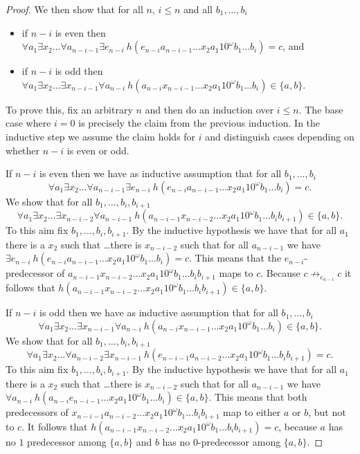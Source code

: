 \documentclass[a4paper]{article}
\begin{document}
\begin{proof}
We then show that for all $n$, $i \leq n$ and all $b_1,\dots,b_i$
\begin{itemize}
 \item if $n - i$ is even then $\forall a_1 \exists x_2 \dots \forall
a_{n - i - 1} \exists e_{n - i} \  h(e_{n - i} a_{n - i - 1} \dots x_2
a_1 1 0^\omega b_1 \dots b_i) = c$, and
 \item if $n - i$ is odd then $\forall a_1 \exists x_2 
\dots \exists x_{n - i - 1} \forall a_{n - i} \
h(a_{n - i} x_{n - i - 1} \dots
x_2 a_1 1 0^\omega b_1 \dots b_i) \in \{a,b\}$.
\end{itemize}
To prove this, fix an arbitrary $n$ and then do an induction over $i
\leq n$. The base case where $i = 0$ is precisely the claim from the
previous induction. In the inductive step we assume the claim holds for
$i$ and distinguish cases depending on whether $n - i$ is even or odd.

If $n - i$ is even then we have as inductive assumption that for all
$b_1,\dots,b_i$
\[
 \forall a_1 \exists x_2 \dots \forall a_{n - i - 1} \exists e_{n - i} \
h(e_{n - i} a_{n - i - 1} \dots x_2 a_1 1 0^\omega b_1 \dots b_i) = c.
\]
We show that for all $b_1,\dots,b_i,b_{i + 1}$
\[
 \forall a_1 \exists x_2 \dots \exists x_{n - i - 2} \forall a_{n - i -
1} \ h(a_{n - i - 1} x_{n - i - 2} \dots x_2 a_1 1 0^\omega b_1 \dots
b_i b_{i + 1}) \in \{a,b\}.
\]
To this aim fix $b_1,\dots,b_i,b_{i + 1}$. By the inductive hypothesis
we have that for all $a_1$ there is a $x_2$ such that \dots there is
$x_{n - i - 2}$ such that for all $a_{n - i - 1}$ we have $\exists e_{n
- i} \ h(e_{n - i} a_{n - i - 1} \dots x_2 a_1 1 0^\omega b_1 \dots b_i)
  = c$. This means that the $e_{n - i}$-predecessor of $a_{n - i - 1}
x_{n - i - 2} \dots x_2 a_1 1 0^\omega b_1 \dots b_i b_{i + 1}$ maps to
$c$. Because $c \not \rightarrow_{e_{n - i}} c$ it follows that $h(a_{n
- i - 1} x_{n - i - 2} \dots x_2 a_1 1 0^\omega b_1 \dots b_i b_{i + 1})
\in \{a,b\}$.

If $n - i$ is odd then we have as inductive assumption that for all
$b_1,\dots,b_i$
\[
 \forall a_1 \exists x_2 
\dots \exists x_{n - i - 1} \forall a_{n - i} \
h(a_{n - i} x_{n - i - 1} \dots
x_2 a_1 1 0^\omega b_1 \dots b_i) \in \{a,b\}.
\]
We show that for all $b_1,\dots,b_i,b_{i + 1}$
\[
 \forall a_1 \exists x_2 \dots \forall a_{n - i - 2} \exists x_{n - i -
1} \ h(e_{n - i - 1} a_{n - i - 2} \dots x_2 a_1 1 0^\omega b_1 \dots
b_i b_{i + 1}) = c.
\]
To this aim fix $b_1,\dots,b_i,b_{i + 1}$. By the inductive hypothesis
we have that for all $a_1$ there is a $x_2$ such that \dots there is
$x_{n - i - 2}$ such that for all $a_{n - i - 1}$ we have $\forall a_{n
- i} \ h(a_{n - i} e_{n - i - 1} \dots x_2 a_1 1 0^\omega b_1 \dots b_i)
  \in \{a,b\}$. This means that both predecessors of $x_{n - i - 1} a_{n
- i - 2} \dots x_2 a_1 1 0^\omega b_1 \dots b_i b_{i + 1}$ map to either
$a$ or $b$, but not to $c$. It follows that $h(a_{n - i - 1} x_{n - i -
2} \dots x_2 a_1 1 0^\omega b_1 \dots b_i b_{i + 1}) = c$, because $a$
has no $1$ predecessor among $\{a,b\}$ and $b$ has no $0$-predecessor
among $\{a, b\}$.


\end{proof}
\end{document}
